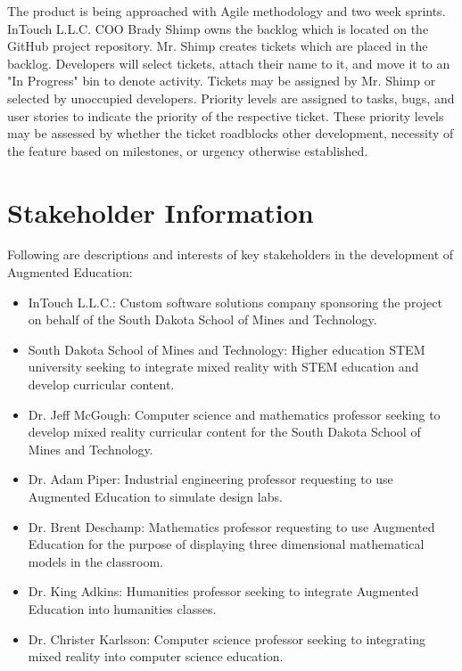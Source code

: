 The product is being approached with Agile methodology and two week sprints. InTouch L.L.C. COO Brady Shimp owns the backlog which is located on the GitHub project repository. Mr. Shimp creates tickets which are placed in the backlog. Developers will select tickets, attach their name to it, and move it to an "In Progress" bin to denote activity. Tickets may be assigned by Mr. Shimp or selected by unoccupied developers. Priority levels are assigned to tasks, bugs, and user stories to indicate the priority of the respective ticket. These priority levels may be assessed by whether the ticket roadblocks other development, necessity of the feature based on milestones, or urgency otherwise established.

\section{ Stakeholder Information}



Following are descriptions and interests of key stakeholders in the development of Augmented Education:

\begin{itemize}
	\item InTouch L.L.C.: Custom software solutions company sponsoring the project on behalf of the South Dakota School of Mines and Technology. 
	\item South Dakota School of Mines and Technology: Higher education STEM university seeking to integrate mixed reality with STEM education and develop curricular content.
	\item Dr. Jeff McGough: Computer science and mathematics professor seeking to develop mixed reality curricular content for the South Dakota School of Mines and Technology. 
	\item Dr. Adam Piper: Industrial engineering professor requesting to use Augmented Education to simulate design labs.
	\item Dr. Brent Deschamp: Mathematics professor requesting to use Augmented Education for the purpose of displaying three dimensional mathematical models in the classroom. 
	\item Dr. King Adkins: Humanities professor seeking to integrate Augmented Education into humanities classes. 
	\item Dr. Christer Karlsson: Computer science professor seeking to integrating mixed reality into computer science education.
\end{itemize}


